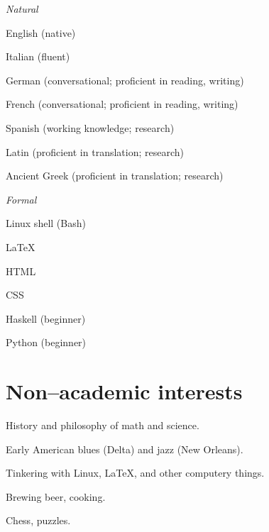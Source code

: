 \documentclass[11pt,letterpaper]{article}
\newcommand{\cvitem}[2]{%
  \begin{minipage}[t]{0.24\textwidth}
    #1 %
  \end{minipage}
  \hfill
  \begin{minipage}[t]{0.74\textwidth}
    #2 %
  \end{minipage}
}
\renewenvironment{itemize}{%
  \begin{list}{}{%
    \setlength{\itemsep}{0.5em}
    \setlength{\leftmargin}{0em}
  }
}{%
  \end{list}
}
\begin{document}
\cvitem{\textit{Natural}}{%
  \begin{itemize}
    \item English \hfill (native)
    \item Italian \hfill (fluent)
    \item German \hfill (conversational; proficient in reading, writing)
    \item French \hfill (conversational; proficient in reading, writing)
    \item Spanish \hfill (working knowledge; research)
    \item Latin \hfill (proficient in translation; research)
    \item Ancient Greek \hfill (proficient in translation; research)
  \end{itemize}
}

\cvitem{\textit{Formal}}{%
  \begin{itemize}
    \item Linux shell (Bash)
    \item \LaTeX{}
    \item HTML
    \item CSS
    \item Haskell \hfill (beginner)
    \item Python \hfill (beginner)
  \end{itemize}
}



\section*{Non--academic interests}
\begin{description}
  \item History and philosophy of math and science.
  \item Early American blues (Delta) and jazz (New Orleans).
  \item Tinkering with Linux, \LaTeX{}, and other computery things.
  \item Brewing beer, cooking.
  \item Chess, puzzles.
\end{description}
\end{document}
